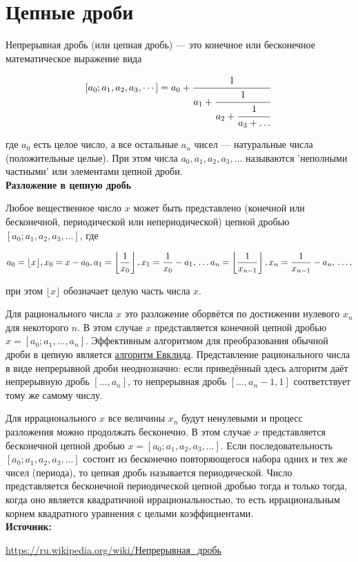 \documentclass[12pt,a4paper]{scrartcl}
\begin{document}
	
\section{Цепные дроби}

Непрерывная дробь (или цепная дробь) — это конечное или бесконечное математическое выражение вида

$$[a_{0};a_{1},a_{2},a_{3},\cdots ]=a_{0}+{\cfrac {1}{a_{1}+{\cfrac {1}{a_{2}+{\cfrac {1}{a_{3}+\ldots }}}}}}\;$$

где $a_{0}$ есть целое число, а все остальные $a_n$ чисел — натуральные числа (положительные целые). При этом числа $a_{0},a_{1},a_{2},a_{3},...$ называются 'неполными частными' или элементами цепной дроби.\\

\textbf{Разложение в цепную дробь}

Любое вещественное число $x$ может быть представлено (конечной или бесконечной, периодической или непериодической) цепной дробью $[a_{0};a_{1},a_{2},a_{3},...]$, где

$$a_{0}=\lfloor x\rfloor ,x_{0}=x-a_{0},\\
a_{1}=\left\lfloor {\frac {1}{x_{0}}}\right\rfloor ,x_{1}={\frac {1}{x_{0}}}-a_{1},\\
\dots \\
a_{n}=\left\lfloor {\frac {1}{x_{n-1}}}\right\rfloor ,x_{n}={\frac {1}{x_{n-1}}}-a_{n},\\
\dots,$$

при этом $\lfloor x\rfloor$ обозначает целую часть числа $x$.

Для рационального числа $x$ это разложение оборвётся по достижении нулевого $x_{n}$ для некоторого $n$. В этом случае $x$ представляется конечной цепной дробью $x=[a_{0};a_{1},... ,a_{n}]$. Эффективным алгоритмом для преобразования обычной дроби в цепную является  \href{https://yatb.kksctf.ru/}{алгоритм Евклида}. Представление рационального числа в виде непрерывной дроби неоднозначно: если приведённый здесь алгоритм даёт непрерывную дробь $[... ,a_{n}]$, то непрерывная дробь $[... ,a_{n}-1,1]$ соответствует тому же самому числу.

Для иррационального $x$ все величины $x_{n}$ будут ненулевыми и процесс разложения можно продолжать бесконечно. В этом случае $x$ представляется бесконечной цепной дробью $x=[a_{0};a_{1},a_{2},a_{3},... ]$. Если последовательность $[a_0; a_1, a_2, a_3,...]$ состоит из бесконечно повторяющегося набора одних и тех же чисел (периода), то цепная дробь называется периодической. Число представляется бесконечной периодической цепной дробью тогда и только тогда, когда оно является квадратичной иррациональностью, то есть иррациональным корнем квадратного уравнения с целыми коэффициентами.\\

\textbf{Источник:}

\href{https://ru.wikipedia.org/wiki/%D0%9D%D0%B5%D0%BF%D1%80%D0%B5%D1%80%D1%8B%D0%B2%D0%BD%D0%B0%D1%8F_%D0%B4%D1%80%D0%BE%D0%B1%D1%8C}{https://ru.wikipedia.org/wiki/Непрерывная\_дробь}
	
\end{document}
